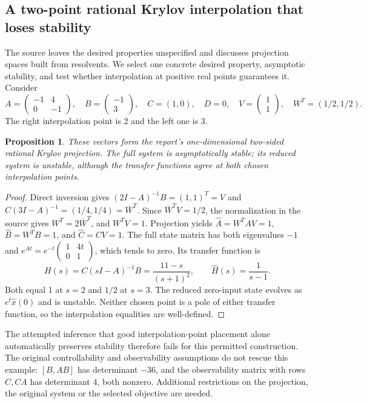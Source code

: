 \documentclass[11pt]{article}
\newtheorem{proposition}{Proposition}
\begin{document}
\subsection{A two-point rational Krylov interpolation that loses stability}
The source leaves the desired properties unspecified and discusses projection spaces built from resolvents. We select one concrete desired property, asymptotic stability, and test whether interpolation at positive real points guarantees it. Consider
\[
A=\begin{pmatrix}-1&4\\0&-1\end{pmatrix},\quad
B=\begin{pmatrix}-1\\3\end{pmatrix},\quad C=(1,0),\quad D=0,
\quad V=\begin{pmatrix}1\\1\end{pmatrix},\quad W^T=(1/2,1/2).
\]
The right interpolation point is 2 and the left one is 3.
\begin{proposition}
These vectors form the report's one-dimensional two-sided rational Krylov projection. The full system is asymptotically stable; its reduced system is unstable, although the transfer functions agree at both chosen interpolation points.
\end{proposition}
\begin{proof}
Direct inversion gives $(2I-A)^{-1}B=(1,1)^T=V$ and $C(3I-A)^{-1}=(1/4,1/4)=\overline W^T$. Since $\overline W^TV=1/2$, the normalization in the source gives $W^T=2\overline W^T$, and $W^TV=1$. Projection yields
$\widehat A=W^TAV=1$, $\widehat B=W^TB=1$, and $\widehat C=CV=1$.
The full state matrix has both eigenvalues $-1$ and $e^{At}=e^{-t}\begin{pmatrix}1&4t\\0&1\end{pmatrix}$, which tends to zero. Its transfer function is
\[
H(s)=C(sI-A)^{-1}B=\frac{11-s}{(s+1)^2},
\qquad \widehat H(s)=\frac1{s-1}.
\]
Both equal 1 at $s=2$ and $1/2$ at $s=3$. The reduced zero-input state evolves as $e^t\widehat x(0)$ and is unstable. Neither chosen point is a pole of either transfer function, so the interpolation equalities are well-defined.
\end{proof}
The attempted inference that good interpolation-point placement alone automatically preserves stability therefore fails for this permitted construction. The original controllability and observability assumptions do not rescue this example: $[B,AB]$ has determinant $-36$, and the observability matrix with rows $C,CA$ has determinant 4, both nonzero. Additional restrictions on the projection, the original system or the selected objective are needed.
\end{document}
